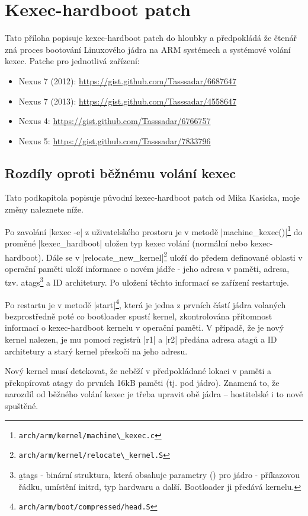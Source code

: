 \documentclass[12pt, a4paper, oneside]{article}
\begin{document}
\section*{Kexec-hardboot patch}
\label{sec:kexec-hardboot}
Tato příloha popisuje kexec-hardboot patch do hloubky a předpokládá že čtenář zná proces bootování Linuxového jádra na ARM systémech a systémové volání kexec. Patche pro jednotlivá zařízení:
\begin{itemize}
    \item Nexus 7 (2012): \url{https://gist.github.com/Tasssadar/6687647}
    \item Nexus 7 (2013): \url{https://gist.github.com/Tasssadar/4558647}
    \item Nexus 4: \url{https://gist.github.com/Tasssadar/6766757}
    \item Nexus 5: \url{https://gist.github.com/Tasssadar/7833796}
\end{itemize}

\subsection*{Rozdíly oproti běžnému volání kexec}
Tato podkapitola popisuje původní kexec-hardboot patch od Mika Kasicka, moje změny naleznete níže.

Po zavolání |kexec -e| z uživatelského prostoru je v metodě |machine_kexec()|\footnote{\verb-arch/arm/kernel/machine\_kexec.c-} do proměné |kexec_hardboot| uložen typ kexec volání (normální nebo kexec-hardboot). Dále se v |relocate_new_kernel|\footnote{\verb-arch/arm/kernel/relocate\_kernel.S-} uloží do předem definované oblasti v operační paměti uloží informace o novém jádře - jeho adresa v paměti, adresa, tzv. atags\footnote{\b{atags} - binární struktura, která obsahuje parametry () pro jádro - příkazovou řádku, umístění initrd, typ hardwaru a další. Bootloader ji předává kernelu.} a ID architetury. Po uložení těchto informací se zařízení restartuje.

Po restartu je v metodě |start|\footnote{\verb-arch/arm/boot/compressed/head.S-}, která je jedna z prvních částí jádra volaných bezprostředně poté co bootloader spustí kernel, zkontrolována přítomnost informací o kexec-hardboot kernelu v operační paměti. V případě, že je nový kernel nalezen, je mu pomocí registrů |r1| a |r2| předána adresa atagů a ID architetury a starý kernel přeskočí na jeho adresu.

Nový kernel musí detekovat, že neběží v předpokládané lokaci v paměti a překopírovat atagy do prvních 16kB paměti (tj. pod jádro). Znamená to, že narozdíl od běžného volání kexec je třeba upravit obě jádra -- hostitelské i to nově spuštěné.
\end{document}
